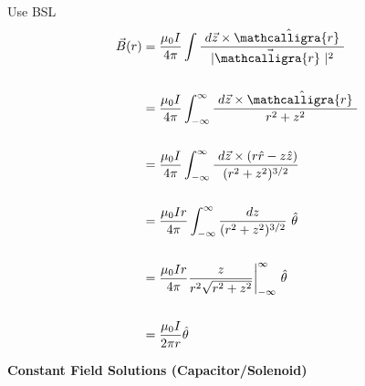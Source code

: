 \documentclass[12pt]{article}
\newcommand{\scripty}[1]{\ensuremath{\mathcalligra{#1}}}
\newcommand*{\cursrr}{\scripty{r}\ }
\begin{document}
\begin{minipage}[t]{0.5\textwidth}
Use BSL\\
\begin{align*}
	\vec{B}(r) &= \frac{\mu_0 I}{4 \pi}
		\int \frac{ \ d\vec{z} \times \hat{\cursrr} }{|\vec{ \cursrr } |^2} \\ \\
	&= \frac{\mu_0 I}{4 \pi} 
		\int_{-\infty}^{\infty} \frac{ \ d\vec{z} \times \hat{\cursrr} }{r^2 + z^2} \\ \\
	&= \frac{\mu_0 I}{4 \pi} 
		\int_{-\infty}^{\infty} \frac{ \ d\vec{z} \times (r\hat{r} - z\hat{z}) }{ (r^2 + z^2)^{3/2} } \\ \\
	&= \frac{\mu_0 I r}{4 \pi} 
		\int_{-\infty}^{\infty} \frac{dz}{ (r^2 + z^2)^{3/2} } \ \hat{\theta} \\ \\
	&= \frac{\mu_0 I r}{4 \pi} 
		\frac{z}{ r^2 \sqrt{r^2 + z^2} } \bigg|_{-\infty}^{\infty} \ \hat{\theta} \\ \\
	&= \frac{\mu_0 I }{2 \pi r} \hat{\theta}
\end{align*}
\end{minipage}

\newpage \noindent 
\textbf{Constant Field Solutions (Capacitor/Solenoid)}
\end{document}
